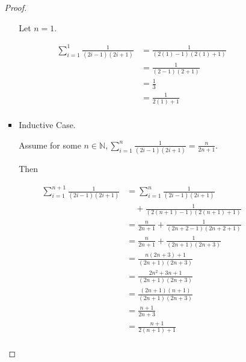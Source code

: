 \documentclass[12pt,letterpaper]{article}
\begin{document}
\begin{enumerate}
\begin{enumerate}
\begin{enumerate}
\begin{proof}
\begin{itemize}
                    Let $n = 1$.

                    \begin{align*}
                      \sum_{i = 1}^1 \frac{1}{\left(2i - 1\right)\left(2i + 1\right)}
                      &= \frac{1}{\left(2\left(1\right) - 1\right)\left(2\left(1\right) + 1\right)} \\
                      &= \frac{1}{\left(2 - 1\right)\left(2 + 1\right)} \\
                      &= \frac{1}{3} \\
                      &= \frac{1}{2\left(1\right) + 1}\\
                    \end{align*}
                  \item Inductive Case.

                    Assume for some $n \in \mathbb{N}, \sum\limits_{i = 1}^n \frac{1}{\left(2i - 1\right)\left(2i + 1\right)} = \frac{n}{2n + 1}$.

                    Then

                    \begin{align*}
                      \sum_{i = 1}^{n + 1} \frac{1}{\left(2i - 1\right)\left(2i + 1\right)}
                      &= \sum_{i = 1}^n \frac{1}{\left(2i - 1\right)\left(2i + 1\right)} \\
                      &\quad + \frac{1}{\left(2\left(n + 1\right) - 1\right)\left(2\left(n + 1\right) + 1\right)}\\
                      &= \frac{n}{2n + 1} + \frac{1}{\left(2n + 2 - 1\right)\left(2n + 2 + 1\right)}\\
                      &= \frac{n}{2n + 1} + \frac{1}{\left(2n + 1\right)\left(2n + 3\right)}\\
                      &= \frac{n(2n + 3) + 1}{\left(2n + 1\right)\left(2n + 3\right)}\\
                      &= \frac{2n^2 + 3n + 1}{\left(2n + 1\right)\left(2n + 3\right)}\\
                      &= \frac{\left(2n + 1\right)\left(n + 1\right)}{\left(2n + 1\right)\left(2n + 3\right)}\\
                      &= \frac{n + 1}{2n + 3}\\
                      &= \frac{n + 1}{2\left(n + 1\right) + 1} \\
                    \end{align*}


\end{itemize}
\end{proof}
\end{enumerate}
\end{enumerate}
\end{enumerate}
\end{document}
